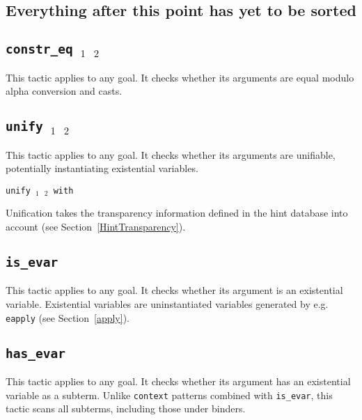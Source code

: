 \begin{coq_example*}
\section{Everything after this point has yet to be sorted}


\subsection{\tt constr\_eq \term$_1$ \term$_2$}
\label{constreq}

This tactic applies to any goal. It checks whether its arguments are
equal modulo alpha conversion and casts.

\ErrMsg {}

\subsection{\tt unify \term$_1$ \term$_2$}
\label{unify}

This tactic applies to any goal. It checks whether its arguments are
unifiable, potentially instantiating existential variables.

\ErrMsg {}

\begin{Variants}
\item {\tt unify \term$_1$ \term$_2$ with \ident}

  Unification takes the transparency information defined in the
  hint database {\tt \ident} into account (see Section~\ref{HintTransparency}).
\end{Variants}

\subsection{\tt is\_evar \term}
\label{isevar}

This tactic applies to any goal. It checks whether its argument is an
existential variable. Existential variables are uninstantiated
variables generated by e.g. {\tt eapply} (see Section~\ref{apply}).

\ErrMsg {}

\subsection{\tt has\_evar \term}
\label{hasevar}

This tactic applies to any goal. It checks whether its argument has an
existential variable as a subterm. Unlike {\tt context} patterns
combined with {\tt is\_evar}, this tactic scans all subterms,
including those under binders.


\end{coq_example*}
